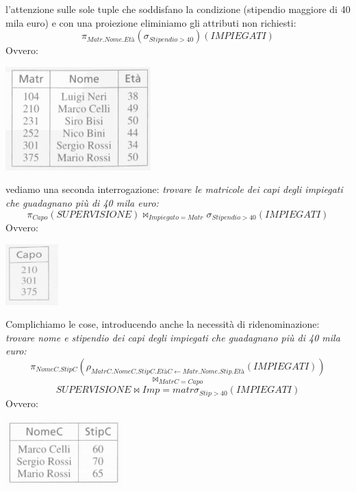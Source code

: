 \documentclass[a4paper,12pt, oneside]{book}
\begin{document}
l'attenzione sulle sole tuple che soddisfano la condizione (stipendio maggiore di
40 mila euro) e con una proiezione eliminiamo gli attributi non richiesti:
\[\pi_{Matr.Nome.Età}(\sigma_{Stipendio>40})(IMPIEGATI)\]
Ovvero:
\begin{center}
\includegraphics[scale=0.7]{img/int1.png}
\end{center}
vediamo una seconda interrogazione: \textit{trovare le matricole dei capi degli impiegati che guadagnano più di 40
  mila euro:}
\[\pi_{Capo}(SUPERVISIONE)\Join_{Impiegato=Matr}\sigma_{Stipendio>40}(IMPIEGATI)\]
Ovvero:
\begin{center}
\includegraphics[scale=0.7]{img/int2.png}
\end{center}
Complichiamo le cose, introducendo anche la necessità di ridenominazione: \textit{trovare nome e stipendio dei capi degli impiegati che
  guadagnano più di 40 mila euro:}
\[\pi_{NomeC.StipC}(\rho_{MatrC.NomeC.StipC.EtàC\leftarrow Matr.Nome.Stip.Età}(IMPIEGATI))\]
\[\Join_{MatrC=Capo}\]
\[SUPERVISIONE\Join{Imp=matr}\sigma_{Stip>40}(IMPIEGATI)\]
Ovvero:
\begin{center}
\includegraphics[scale=0.7]{img/int3.png}
\end{center}
\end{document}
